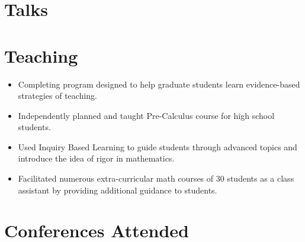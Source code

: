 \documentclass{cultvoucher}
\begin{document}
\section{Talks}

\section{Teaching}

\begin{itemize}
	\vspace{-0.25em}
	\item Completing program designed to help graduate students learn evidence-based strategies of teaching.
\end{itemize}

\begin{itemize}
	\vspace{-0.25em}
	\item Independently planned and taught Pre-Calculus course for high school students.
	\item Used Inquiry Based Learning to guide students through advanced topics and introduce the idea of rigor in mathematics.
\end{itemize}

\begin{itemize}
	\vspace{-0.25em}
	\item Facilitated numerous extra-curricular math courses of 30 students as
	      a class assistant by providing additional guidance to students.
\end{itemize}

\section{Conferences Attended}


\end{document}
